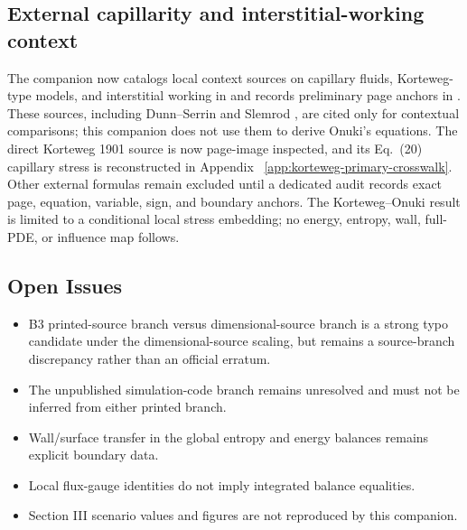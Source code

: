 \subsection*{External capillarity and interstitial-working context}

The companion now catalogs local context sources on capillary fluids,
Korteweg-type models, and interstitial working in
 and
records preliminary page anchors in
.  These
sources, including Dunn--Serrin and Slemrod
\citep{DunnSerrin1985,Slemrod1983VanDerWaalsPhaseBoundaries}, are cited only for
contextual comparisons; this companion does not use them to derive Onuki's
equations.  The direct Korteweg 1901 source is now page-image
inspected, and its Eq.~(20) capillary stress is reconstructed in Appendix~
\ref{app:korteweg-primary-crosswalk}.  Other external formulas remain excluded
until a dedicated audit records exact page, equation, variable, sign, and
boundary anchors.  The Korteweg--Onuki result is limited to a conditional local
stress embedding; no energy, entropy, wall, full-PDE, or influence map follows.

\subsection*{Open Issues}

\begin{itemize}
\item B3 printed-source branch versus dimensional-source branch is a strong
  typo candidate under the dimensional-source scaling, but remains a
  source-branch discrepancy rather than an official erratum.
\item The unpublished simulation-code branch remains unresolved and must not be
  inferred from either printed branch.
\item Wall/surface transfer in the global entropy and energy balances remains
  explicit boundary data.
\item Local flux-gauge identities do not imply integrated balance equalities.
\item Section III scenario values and figures are not reproduced by this
  companion.
\end{itemize}
